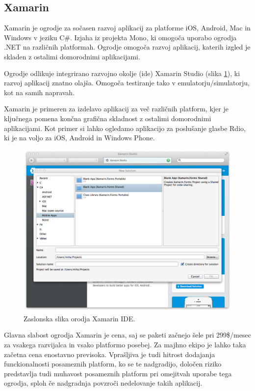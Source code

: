 \subsection{Xamarin}

Xamarin\cite{xamarin} je ogrodje za sočasen razvoj aplikacij za platforme iOS, Android, Mac in Windows v jeziku C\#. Izjaha iz projekta Mono\cite{mono}, ki omogoča uporabo ogrodja .NET\cite{dotnet} na različnih platformah. Ogrodje omogoča razvoj aplikacij, katerih izgled je skladen z ostalimi domorodnimi aplikacijami.

Ogrodje odlikuje integrirano razvojno okolje (\gls{ide}) Xamarin Studio (slika \ref{fig:xamarin}), ki razvoj aplikacij znatno olajša. Omogoča testiranje tako v emulatorju/simulatorju, kot na samih napravah.

Xamarin je primeren za izdelavo aplikacij za več različnih platform, kjer je ključnega pomena končna grafična skladnost z ostalimi domorodnimi aplikacijami. Kot primer si lahko ogledamo aplikacijo za poslušanje glasbe Rdio\cite{rdio}, ki je na voljo za iOS, Android in Windows Phone.

\begin{figure}
 \includegraphics[width=\linewidth]{xamarin}
 \caption{Zaslonska slika orodja Xamarin IDE.}
 \label{fig:xamarin}
\end{figure}

Glavna slabost ogrodja Xamarin je cena, saj se paketi začnejo šele pri 299\$/mesec za vsakega razvijalca in vsako platformo posebej. Za majhno ekipo je lahko taka začetna cena enostavno previsoka. Vprašljiva je tudi hitrost dodajanja funckionalnosti posameznih platform, ko se te nadgradijo, določen riziko predstavlja tudi muhavost posameznih platform pri omejitvah uporabe tega ogrodja, sploh če nadgradnja povzroči nedelovanje takih aplikacij.

